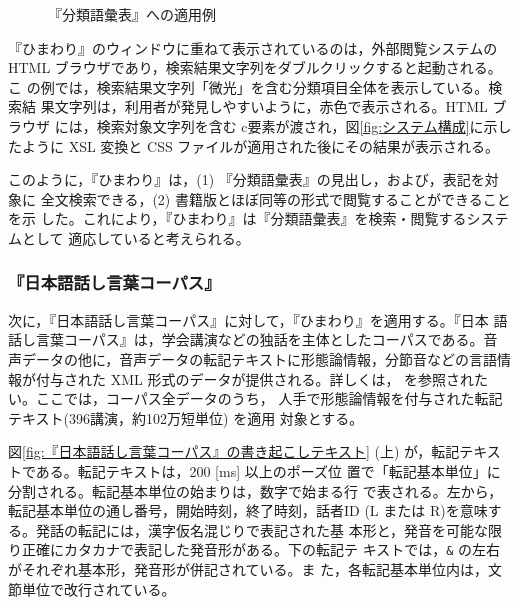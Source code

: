 \begin{figure}[hbt]
 \begin{center}
  \epsfxsize=13.5cm
  \caption{『分類語彙表』への適用例}
  \label{fig:適用例(分類語彙表)}
 \end{center}   
\end{figure}

『ひまわり』のウィンドウに重ねて表示されているのは，外部閲覧システムの
HTML ブラウザであり，検索結果文字列をダブルクリックすると起動される。こ
の例では，検索結果文字列「微光」を含む分類項目全体を表示している。検索結
果文字列は，利用者が発見しやすいように，赤色で表示される。HTML ブラウザ
には，検索対象文字列を含む c要素が渡され，図\ref{fig:システム構成}に示し
たように XSL 変換と CSS ファイルが適用された後にその結果が表示される。

このように，『ひまわり』は，(1) 『分類語彙表』の見出し，および，表記を対象に
全文検索できる，(2) 書籍版とほぼ同等の形式で閲覧することができることを示
した。これにより，『ひまわり』は『分類語彙表』を検索・閲覧するシステムとして
適応していると考えられる。










\subsubsection{『日本語話し言葉コーパス』}
次に，『日本語話し言葉コーパス』に対して，『ひまわり』を適用する。『日本
語話し言葉コーパス』は，学会講演などの独話を主体としたコーパスである。音
声データの他に，音声データの転記テキストに形態論情報，分節音などの言語情
報が付与された XML 形式のデータが提供される。詳しくは，
を参照されたい。ここでは，コーパス全データのうち，
人手で形態論情報を付与された転記テキスト(396講演，約102万短単位) を適用
対象とする。

図\ref{fig:『日本語話し言葉コーパス』の書き起こしテキスト} (上)
が，転記テキストである。転記テキストは，200 [ms] 以上のポーズ位
置で「転記基本単位」に分割される。転記基本単位の始まりは，数字で始まる行
で表される。左から，転記基本単位の通し番号，開始時刻，終了時刻，話者ID (L 
または R)を意味する。発話の転記には，漢字仮名混じりで表記された基
本形と，発音を可能な限り正確にカタカナで表記した発音形がある。下の転記テ
キストでは，\verb+&+ の左右がそれぞれ基本形，発音形が併記されている。ま
た，各転記基本単位内は，文節単位で改行されている。

